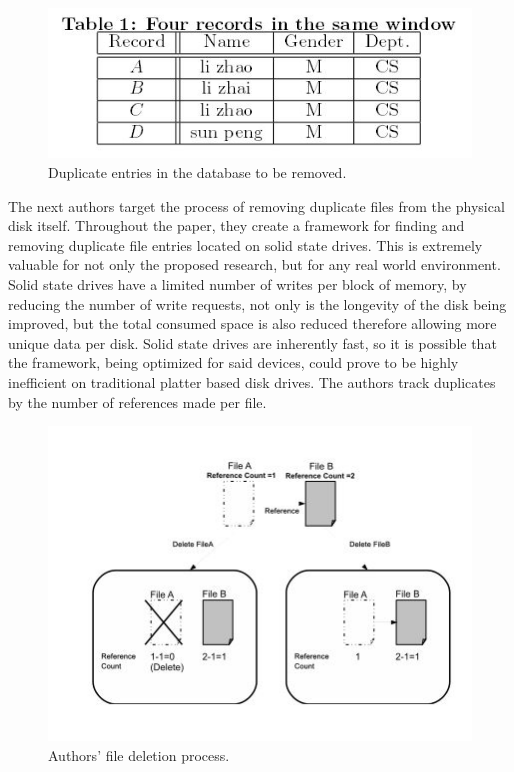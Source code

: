 \documentclass[11pt]{article}
\begin{document}
\begin{figure}
\begin{center}
\includegraphics[scale=.8]{duptable}
\caption{\label{fig:duptable} Duplicate entries in the database to be removed.}
\end{center}
\end{figure}

The next authors target the process of removing duplicate files from the physical disk itself. Throughout the paper, they create a framework for finding and removing duplicate file entries located on solid state drives. \cite{Wu:2011:DDA:1982185.1982313} This is extremely valuable for not only the proposed research, but for any real world environment. Solid state drives have a limited number of writes per block of memory, by reducing the number of write requests, not only is the longevity of the disk being improved, but the total consumed space is also reduced therefore allowing more unique data per disk. Solid state drives are inherently fast, so it is possible that the framework, being optimized for said devices, could prove to be highly inefficient on traditional platter based disk drives. The authors track duplicates by the number of references made per file. 

\begin{figure}
\begin{center}
\includegraphics[scale=.8]{delete}
\caption{\label{fig:delete} Authors' file deletion process.}
\end{center}
\end{figure}
\end{document}

